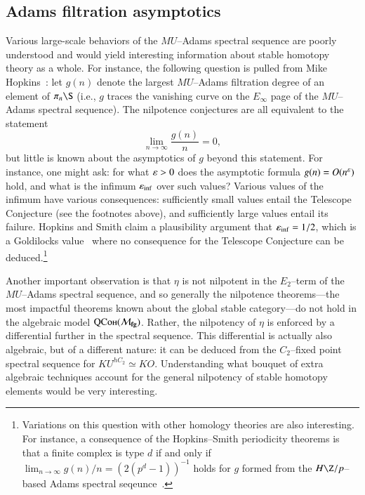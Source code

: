 \subsection*{Adams filtration asymptotics}

Various large-scale behaviors of the $MU$--Adams spectral sequence are poorly understood and would yield interesting information about stable homotopy theory as a whole.  For instance, the following question is pulled from Mike Hopkins~\cite[Section 10]{HopkinsOnRavenel}: let $g(n)$ denote the largest $MU$--Adams filtration degree of an element of $\pi_n \S$ (i.e., $g$ traces the vanishing curve on the $E_\infty$ page of the $MU$--Adams spectral sequence).  The nilpotence conjectures are all equivalent to the statement \[\lim_{n \to \infty} \frac{g(n)}{n} = 0,\] but little is known about the asymptotics of $g$ beyond this statement.  For instance, one might ask: for what $\varepsilon > 0$ does the asymptotic formula $g(n) = O(n^{\varepsilon})$ hold, and what is the infimum $\varepsilon_{\inf}$ over such values?  Various values of the infimum have various consequences: sufficiently small values entail the Telescope Conjecture (see the footnotes above), and sufficiently large values entail its failure.  Hopkins and Smith claim a plausibility argument that $\varepsilon_{\inf} = 1/2$, which is a Goldilocks value~\cite{Dicke} where no consequence for the Telescope Conjecture can be deduced.\footnote{Variations on this question with other homology theories are also interesting.  For instance, a consequence of the Hopkins--Smith periodicity theorems is that a finite complex is type $d$ if and only if $\lim_{n \to \infty} g(n) / n = (2(p^d-1))^{-1}$ holds for $g$ formed from the $H\Z/p$--based Adams spectral seqeunce~\cite[Section 3.5]{HopkinsICMZurich}.}

Another important observation is that $\eta$ is not nilpotent in the $E_2$--term of the $MU$--Adams spectral sequence, and so generally the nilpotence theorems---the most impactful theorems known about the global stable category---do not hold in the algebraic model $\normalfont\textsc{QCoh}(\mathcal{M}_{\mathbf{fg}})$.  Rather, the nilpotency of $\eta$ is enforced by a differential further in the spectral sequence.  This differential is actually also algebraic, but of a different nature: it can be deduced from the $C_2$--fixed point spectral sequence for $KU^{hC_2} \simeq KO$.  Understanding what bouquet of extra algebraic techniques account for the general nilpotency of stable homotopy elements would be very interesting.

